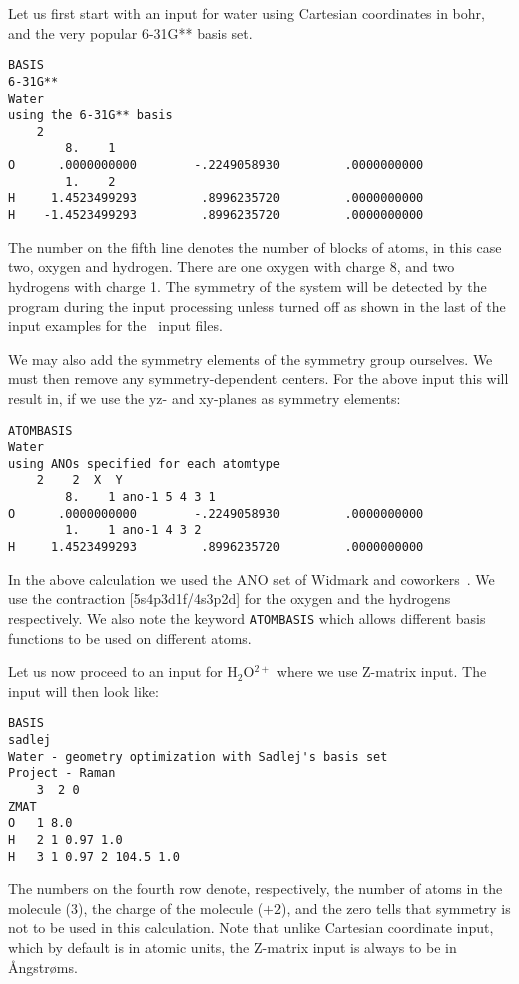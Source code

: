 Let us first start with an input for water using Cartesian coordinates
in bohr, and the very popular 6-31G** basis set.

\begin{verbatim}
BASIS
6-31G**
Water
using the 6-31G** basis
    2
        8.    1
O      .0000000000        -.2249058930         .0000000000
        1.    2
H     1.4523499293         .8996235720         .0000000000
H    -1.4523499293         .8996235720         .0000000000
\end{verbatim}

The number on the fifth line denotes the number of blocks of atoms,
in this case two, oxygen and hydrogen. There are one oxygen with
charge 8, and two hydrogens with charge 1. The symmetry of the system
will be detected by the program during the input processing unless
turned off as shown in the last of the input examples for the \mol\
input files.

We may also add the symmetry elements of the
symmetry group\index{symmetry!group} ourselves. We must
then remove any symmetry-dependent centers. For the above input this
will result in, if we use the yz- and xy-planes as symmetry elements:

\begin{verbatim}
ATOMBASIS
Water
using ANOs specified for each atomtype
    2    2  X  Y
        8.    1 ano-1 5 4 3 1
O      .0000000000        -.2249058930         .0000000000
        1.    1 ano-1 4 3 2
H     1.4523499293         .8996235720         .0000000000
\end{verbatim}

In the above calculation we used the ANO set of
Widmark and
coworkers~\cite{powpambortca77,powbjpbortca79}. We
use the contraction
[5s4p3d1f/4s3p2d] for the oxygen and the hydrogens respectively. We
also note the keyword \verb|ATOMBASIS|\index{ATOMBASIS} which allows
different basis
functions to be used on different atoms.

Let us now proceed to an input for H$_{2}$O$^{2+}$ where we use
Z-matrix input. The  input will then look like:

\begin{verbatim}
BASIS
sadlej
Water - geometry optimization with Sadlej's basis set
Project - Raman
    3  2 0
ZMAT
O   1 8.0
H   2 1 0.97 1.0
H   3 1 0.97 2 104.5 1.0
\end{verbatim}

The numbers on the fourth row denote, respectively, the number of atoms
in the molecule (3), the charge\index{molecular charge} of the
molecule ($+2$), and the zero
tells that symmetry is not to be used in this calculation. Note that
unlike Cartesian coordinate input, which by default is in atomic units, the
Z-matrix input is always to be in \AA ngstr\o ms.

